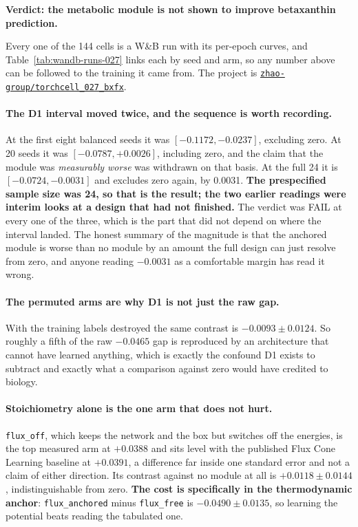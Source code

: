 \textbf{Verdict: the metabolic module is not shown to improve betaxanthin prediction.}

Every one of the 144 cells is a W\&B run with its per-epoch curves, and
Table~\ref{tab:wandb-runs-027} links each by seed and arm, so any number above can be
followed to the training it came from. The project is
\href{https://wandb.ai/zhao-group/torchcell_027_bxfx}{\texttt{zhao-group/torchcell\_027\_bxfx}}.



\paragraph{The D1 interval moved twice, and the sequence is worth recording.} At the first
eight balanced seeds it was $[-0.1172, -0.0237]$, excluding zero. At 20 seeds it was
$[-0.0787, +0.0026]$, including zero, and the claim that the module was \emph{measurably
worse} was withdrawn on that basis. At the full 24 it is $[-0.0724, -0.0031]$ and excludes
zero again, by 0.0031. \textbf{The prespecified sample size was 24, so that is the result;
the two earlier readings were interim looks at a design that had not finished.} The verdict
was FAIL at every one of the three, which is the part that did not depend on where the
interval landed. The honest summary of the magnitude is that the anchored module is worse
than no module by an amount the full design can just resolve from zero, and anyone reading
$-0.0031$ as a comfortable margin has read it wrong.

\paragraph{The permuted arms are why D1 is not just the raw gap.} With the training labels
destroyed the same contrast is $-0.0093 \pm 0.0124$. So roughly a fifth of the raw $-0.0465$
gap is reproduced by an architecture that cannot have learned anything, which is exactly the
confound D1 exists to subtract and exactly what a comparison against zero would have
credited to biology.

\paragraph{Stoichiometry alone is the one arm that does not hurt.} \texttt{flux\_off}, which
keeps the network and the box but switches off the energies, is the top measured arm at
$+0.0388$ and sits level with the published Flux Cone Learning baseline at $+0.0391$, a
difference far inside one standard error and not a claim of either direction. Its contrast
against no module at all is $+0.0118 \pm 0.0144$, indistinguishable from zero.
\textbf{The cost is specifically in the thermodynamic anchor}: \texttt{flux\_anchored} minus
\texttt{flux\_free} is $-0.0490 \pm 0.0135$, so learning the potential beats reading the
tabulated one.

